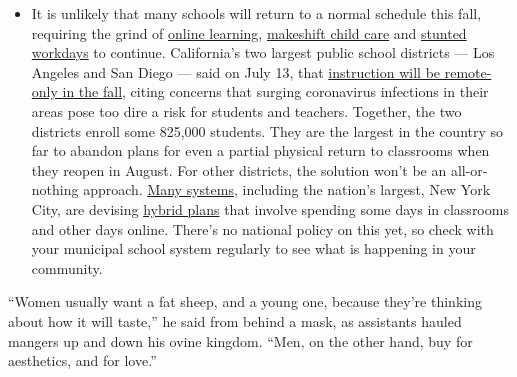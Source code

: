 \begin{itemize}
  \begin{itemize}
  \tightlist
  \item
    It is unlikely that many schools will return to a normal schedule
    this fall, requiring the grind of
    \href{https://www.nytimes3xbfgragh.onion/2020/06/05/us/coronavirus-education-lost-learning.html?action=click\&pgtype=Article\&state=default\&region=MAIN_CONTENT_3\&context=storylines_faq}{online
    learning},
    \href{https://www.nytimes3xbfgragh.onion/2020/05/29/us/coronavirus-child-care-centers.html?action=click\&pgtype=Article\&state=default\&region=MAIN_CONTENT_3\&context=storylines_faq}{makeshift
    child care} and
    \href{https://www.nytimes3xbfgragh.onion/2020/06/03/business/economy/coronavirus-working-women.html?action=click\&pgtype=Article\&state=default\&region=MAIN_CONTENT_3\&context=storylines_faq}{stunted
    workdays} to continue. California's two largest public school
    districts --- Los Angeles and San Diego --- said on July 13, that
    \href{https://www.nytimes3xbfgragh.onion/2020/07/13/us/lausd-san-diego-school-reopening.html?action=click\&pgtype=Article\&state=default\&region=MAIN_CONTENT_3\&context=storylines_faq}{instruction
    will be remote-only in the fall}, citing concerns that surging
    coronavirus infections in their areas pose too dire a risk for
    students and teachers. Together, the two districts enroll some
    825,000 students. They are the largest in the country so far to
    abandon plans for even a partial physical return to classrooms when
    they reopen in August. For other districts, the solution won't be an
    all-or-nothing approach.
    \href{https://bioethics.jhu.edu/research-and-outreach/projects/eschool-initiative/school-policy-tracker/}{Many
    systems}, including the nation's largest, New York City, are
    devising
    \href{https://www.nytimes3xbfgragh.onion/2020/06/26/us/coronavirus-schools-reopen-fall.html?action=click\&pgtype=Article\&state=default\&region=MAIN_CONTENT_3\&context=storylines_faq}{hybrid
    plans} that involve spending some days in classrooms and other days
    online. There's no national policy on this yet, so check with your
    municipal school system regularly to see what is happening in your
    community.
  \end{itemize}
\end{itemize}

``Women usually want a fat sheep, and a young one, because they're
thinking about how it will taste,'' he said from behind a mask, as
assistants hauled mangers up and down his ovine kingdom. ``Men, on the
other hand, buy for aesthetics, and for love.''

